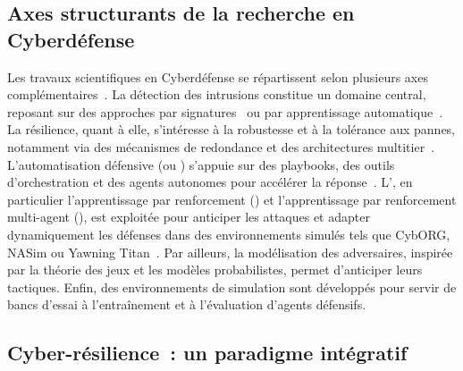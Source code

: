 

\subsection*{Axes structurants de la recherche en Cyberdéfense}

Les travaux scientifiques en Cyberdéfense se répartissent selon plusieurs axes complémentaires~\cite{Buczak2016}. La détection des intrusions constitue un domaine central, reposant sur des approches par signatures~\cite{Axelsson2000} ou par apprentissage automatique~\cite{Sommer2010,Buczak2016}. La résilience, quant à elle, s'intéresse à la robustesse et à la tolérance aux pannes, notamment via des mécanismes de redondance et des architectures multitier~\cite{Bodeau2011}. L'automatisation défensive (ou ) s'appuie sur des playbooks, des outils d'orchestration et des agents autonomes pour accélérer la réponse~\cite{Hazra2022}. L', en particulier l'apprentissage par renforcement () et l'apprentissage par renforcement multi-agent (), est exploitée pour anticiper les attaques et adapter dynamiquement les défenses dans des environnements simulés tels que CybORG, NASim ou Yawning Titan~\cite{Standen2021, nasim2023,Andrew2022}. Par ailleurs, la modélisation des adversaires, inspirée par la théorie des jeux et les modèles probabilistes, permet d'anticiper leurs tactiques. Enfin, des environnements de simulation sont développés pour servir de bancs d'essai à l'entraînement et à l'évaluation d'agents défensifs.


\subsection*{Cyber-résilience~: un paradigme intégratif}

